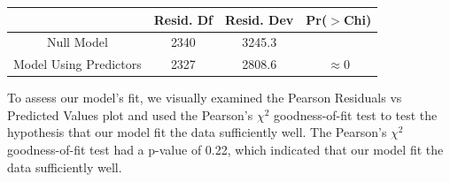 \documentclass[10pt]{article}
\begin{document}
\begin{table}[h!]
\centering
\begin{tabular}{| c | c | c | c | } 
\hline
& Resid. Df & Resid. Dev & Pr($>$Chi) \\ 
\hline
\hline
Null Model & 2340 & 3245.3 & \\
\hline
Model Using Predictors & 2327 & 2808.6 & $\approx 0$\\
\hline  
\end{tabular}
\end{table}

To assess our model's fit, we visually examined the Pearson Residuals vs Predicted Values plot and used the Pearson's $\chi^2$ goodness-of-fit test to test the hypothesis that our model fit the data sufficiently well. The Pearson's $\chi^2$ goodness-of-fit test had a p-value of 0.22, which indicated that our model fit the data sufficiently well. 


\begin{figure}[hbt!]
\hspace*{\fill}
\centering
{}\hspace{2em}
\hspace*{\fill}
\end{figure}
\end{document}
